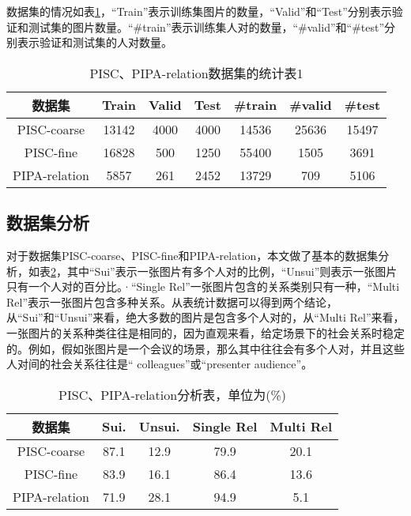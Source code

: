 数据集的情况如表\ref{tab:exp-sta-one}，``Train''表示训练集图片的数量，``Valid''和``Test''分别表示验证和测试集的图片数量。``\#train''表示训练集人对的数量，``\#valid''和``\#test''分别表示验证和测试集的人对数量。
\begin{table}[htpb]
  \centering
  \caption{PISC、PIPA-relation数据集的统计表1}
  \label{tab:exp-sta-one}
  \setlength{\tabcolsep}{4.5mm}
  \begin{tabular}{c|c|c|c|c|c|c}
    \toprule
    数据集 & Train & Valid & Test & \#train  &  \#valid &  \#test  \\
    \midrule
    PISC-coarse & 13142 & 4000 & 4000 & 14536 & 25636 & 15497   \\
    \midrule
    PISC-fine &  16828 & 500 & 1250 & 55400 & 1505 & 3691 \\
    \midrule
    PIPA-relation & 5857 & 261 & 2452 & 13729 & 709 & 5106 \\
    \bottomrule
  \end{tabular}
\end{table}

\subsection{数据集分析} \label{sec:exp-dataset-ana}

对于数据集PISC-coarse、PISC-fine和PIPA-relation，本文做了基本的数据集分析，如表\ref{tab:exp-sta-two}，其中``Sui''表示一张图片有多个人对的比例，``Unsui''则表示一张图片只有一个人对的百分比。·``Single Rel''一张图片包含的关系类别只有一种，``Multi Rel''表示一张图片包含多种关系。从表统计数据可以得到两个结论，从``Sui''和``Unsui''来看，绝大多数的图片是包含多个人对的，从``Multi Rel''来看，一张图片的关系种类往往是相同的，因为直观来看，给定场景下的社会关系时稳定的。例如，假如张图片是一个会议的场景，那么其中往往会有多个人对，并且这些人对间的社会关系往往是``
colleagues''或``presenter audience''。
\begin{table}[htpb]
  \centering
  \caption{PISC、PIPA-relation分析表，单位为(\%)}
  \label{tab:exp-sta-two}
  \begin{tabular}{c|c|c|c|c}
    \toprule
    数据集 & Sui. & Unsui. & Single Rel & Multi Rel \\
    \midrule
    PISC-coarse  & 87.1 & 12.9 & 79.9 & 20.1 \\
    \midrule
    PISC-fine  & 83.9 & 16.1 & 86.4 & 13.6 \\
    \midrule
    PIPA-relation & 71.9 & 28.1 & 94.9 & 5.1 \\
    \bottomrule
  \end{tabular}
\end{table}

